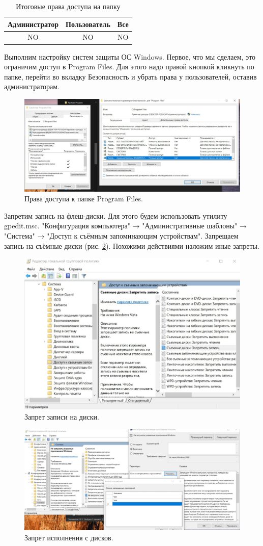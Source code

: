 \begin{table}[h!]
    \centering
    \begin{tabular}{|c|c|c|}
    \hline
    Администратор&Пользователь&Все\\
    \hline
    NO&NO&NO\\
    \hline
    \end{tabular}
    \caption{Итоговые права доступа на папку}
    \label{tab:31}
\end{table}

Выполним настройку систем защиты ОС Windows. Первое, что мы сделаем, это ограничим доступ в Program Files. Для этого надо правой кнопкой кликнуть по папке, перейти во вкладку Безопасность и убрать права у пользователей, оставив администраторам.

\begin{figure}[h!]
    \centering
    \includegraphics[width=0.5\linewidth]{Pic/lab3/photo_2025-05-23_21-53-01.jpg}
    \caption{Права доступа к папке Program Files.}
    \label{fig:ProgramFiles}
\end{figure}

Запретим запись на флеш-диски. Для этого будем использовать утилиту gpedit.msc. "Конфигурация компьютера" → "Административные шаблоны" → "Система" → "Доступ к съёмным запоминающим устройствам". Запрещаем запись на съёмные диски (рис. \ref{fig:disablef}). Похожими действиями наложим иные запреты.

\begin{figure}[h!]
    \centering
    \includegraphics[width=0.5\linewidth]{Pic/lab3/photo_2025-05-23_21-53-04.jpg}
    \caption{Запрет записи на диски.}
    \label{fig:disablef}
\end{figure}

\begin{figure}[h!]
    \centering
    \includegraphics[width=0.5\linewidth]{Pic/lab3/photo_2025-05-23_21-53-06.jpg}
    \caption{Запрет исполнения с дисков.}
    \label{disablexef}
\end{figure}

